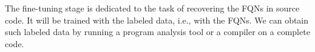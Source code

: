 The fine-tuning stage is dedicated to the task of recovering the FQNs
in source code. It will be trained with the labeled data, i.e., with
the FQNs. We can obtain such labeled data by running a program
analysis tool or a compiler on a complete code.

